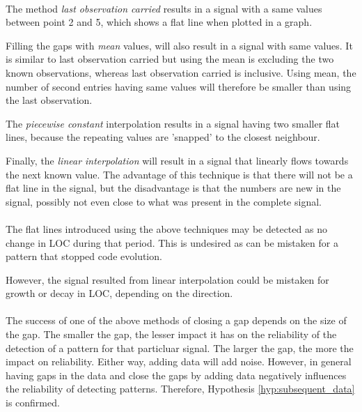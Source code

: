 \paragraph{}
The method \emph{last observation carried }\rm results in a signal with a
same values between point 2 and 5, which shows a flat line when plotted in a
graph.

Filling the gaps with \emph{mean }\rm values, will also result in a signal with
same values. It is similar to last observation carried but using the mean is
excluding the two known observations, whereas last observation carried is
inclusive. Using mean, the number of second entries having same values
will therefore be smaller than using the last observation.

The \emph{piecewise constant }\rm interpolation results in a signal having two
smaller flat lines, because the repeating values are 'snapped' to the closest
neighbour.

Finally, the \emph{linear interpolation }\rm will result in a signal that
linearly flows towards the next known value. The advantage of this technique is
that there will not be a flat line in the signal, but the disadvantage is that
the numbers are new in the signal, possibly not even close to what was present
in the complete signal.

\paragraph{}
The flat lines introduced using the above techniques may be detected as no
change in LOC during that period. This is undesired as can be mistaken for a
pattern that stopped code evolution.

However, the signal resulted from linear interpolation could be mistaken for
growth or decay in LOC, depending on the direction.

\paragraph{}
The success of one of the above methods of closing a gap depends on the size of
the gap. The smaller the gap, the lesser impact it has on the reliability of
the detection of a pattern for that particluar signal. The larger the gap, the
more the impact on reliability. Either way, adding data will add noise.
However, in general having gaps in the data and close the gaps by adding data
negatively influences the reliability of detecting patterns. Therefore,
Hypothesis \ref{hyp:subsequent_data} is confirmed.

